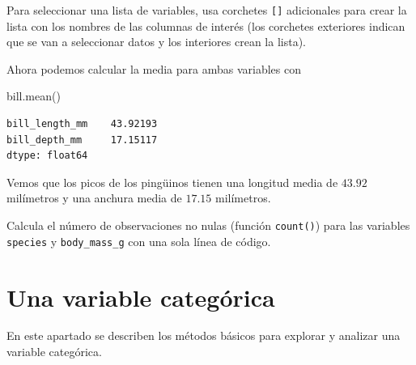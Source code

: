 \documentclass[
  a4paper,
  noprof,
  12pt,
  notoc,
  nosols,
  nobib]{mnye}
\newenvironment{Shaded}{\begin{snugshade}}{\end{snugshade}}
\newcommand{\NormalTok}[1]{\textcolor[rgb]{0.00,0.23,0.31}{#1}}
\renewenvironment{exercise}[1][]{
            \if\relax\detokenize{#1}\relax
                \ex
            \else
                \ex[note={#1}]
            \fi
        }{\endex}
\theoremstyle{definition}
\newtheorem{exercise}{Ejercicio}[section]
\theoremstyle{remark}
\begin{document}
\begin{tcolorbox}[enhanced jigsaw, opacityback=0, leftrule=.75mm, left=2mm, arc=.35mm, rightrule=.15mm, colframe=quarto-callout-note-color-frame, bottomrule=.15mm, colback=white, breakable, toprule=.15mm]
\begin{minipage}[t]{5.5mm}
\textcolor{quarto-callout-note-color}{\faInfo}
\end{minipage}%
\begin{minipage}[t]{\textwidth - 5.5mm}

Para seleccionar una lista de variables, usa corchetes \texttt{{[}{]}}
adicionales para crear la lista con los nombres de las columnas de
interés (los corchetes exteriores indican que se van a seleccionar datos
y los interiores crean la lista).

\end{minipage}%
\end{tcolorbox}

Ahora podemos calcular la media para ambas variables con

\begin{Shaded}
\begin{Highlighting}[]
\NormalTok{bill.mean()}
\end{Highlighting}
\end{Shaded}

\begin{verbatim}
bill_length_mm    43.92193
bill_depth_mm     17.15117
dtype: float64
\end{verbatim}

Vemos que los picos de los pingüinos tienen una longitud media de
\(43.92\) milímetros y una anchura media de \(17.15\) milímetros.

\begin{exercise}[]%
\protect\hypertarget{exr-subset-variables-3}{}\label{exr-subset-variables-3}%
Calcula el número de observaciones no nulas (función \texttt{count()})
para las variables \texttt{species} y \texttt{body\_mass\_g} con una
sola línea de código.

\end{exercise}


\section{Una variable categórica}\label{una-variable-categuxf3rica}

En este apartado se describen los métodos básicos para explorar y
analizar una variable categórica.
\end{document}
